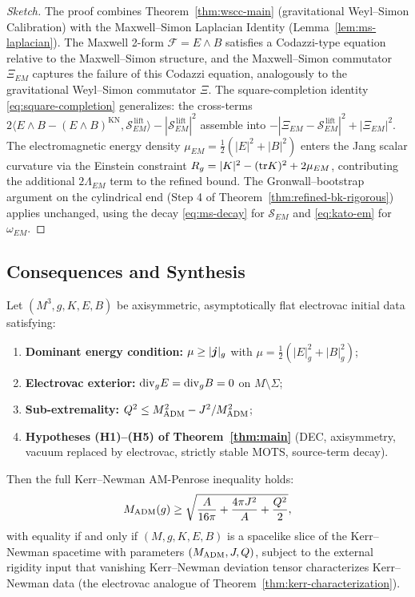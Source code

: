 \begin{proof}[Sketch]
The proof combines Theorem~\ref{thm:wscc-main} (gravitational Weyl--Simon Calibration) with the Maxwell--Simon Laplacian Identity (Lemma~\ref{lem:ms-laplacian}). The Maxwell 2-form $\mathcal{F} = E\wedge B$ satisfies a Codazzi-type equation relative to the Maxwell--Simon structure, and the Maxwell--Simon commutator $\Xi_{EM}$ captures the failure of this Codazzi equation, analogously to the gravitational Weyl--Simon commutator $\Xi$. The square-completion identity \eqref{eq:square-completion} generalizes: the cross-terms $2\langle E\wedge B - (E\wedge B)^{\mathrm{KN}}, \mathcal{S}_{EM}^{\,\mathrm{lift}}\rangle - |\mathcal{S}_{EM}^{\,\mathrm{lift}}|^2$ assemble into $-|\Xi_{EM} - \mathcal{S}_{EM}^{\,\mathrm{lift}}|^2 + |\Xi_{EM}|^2$. The electromagnetic energy density $\mu_{EM} = \tfrac{1}{2}(|E|^2+|B|^2)$ enters the Jang scalar curvature via the Einstein constraint $R_g = |K|^2 - (\mathrm{tr} K)^2 + 2\mu_{EM}$, contributing the additional $2\Lambda_{EM}$ term to the refined bound. The Gronwall--bootstrap argument on the cylindrical end (Step 4 of Theorem~\ref{thm:refined-bk-rigorous}) applies unchanged, using the decay \eqref{eq:ms-decay} for $\mathcal{S}_{EM}$ and \eqref{eq:kato-em} for $\omega_{EM}$.
\end{proof}

\subsection{Consequences and Synthesis}

\begin{corollary}\label{cor:full-KN}
Let $(M^3, g, K, E, B)$ be axisymmetric, asymptotically flat electrovac initial data satisfying:
\begin{enumerate}[label=\textup{(E\arabic*)}]
\item \textbf{Dominant energy condition:} $\mu \geq |\boldsymbol{j}|_g$ with $\mu = \tfrac{1}{2}(|E|^2_g + |B|^2_g)$;
\item \textbf{Electrovac exterior:} $\mathrm{div}_g E = \mathrm{div}_g B = 0$ on $M\setminus\Sigma$;
\item \textbf{Sub-extremality:} $Q^2 \leq M_{\mathrm{ADM}}^2 - J^2/M_{\mathrm{ADM}}^2$;
\item \textbf{Hypotheses (H1)--(H5) of Theorem~\ref{thm:main}} (DEC, axisymmetry, vacuum replaced by electrovac, strictly stable MOTS, source-term decay).
\end{enumerate}
Then the full Kerr--Newman AM-Penrose inequality holds:
\begin{equation}\label{eq:full-KN}
M_{\mathrm{ADM}}(g) \geq \sqrt{\frac{A}{16\pi} + \frac{4\pi J^2}{A} + \frac{Q^2}{2}},
\end{equation}
with equality if and only if $(M, g, K, E, B)$ is a spacelike slice of the Kerr--Newman spacetime with parameters $(M_{\mathrm{ADM}}, J, Q)$, subject to the external rigidity input that vanishing Kerr--Newman deviation tensor characterizes Kerr--Newman data (the electrovac analogue of Theorem~\ref{thm:kerr-characterization}).
\end{corollary}

